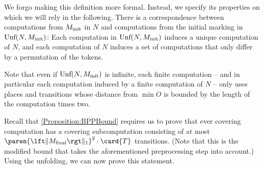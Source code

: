 \documentclass[../../diss.tex]{subfiles}
\begin{document}
We forgo making this definition more formal.
Instead, we specify its properties on which we will rely in the following.
There is a correspondence between computations from $M_{\text{init}}$ in $N$ and computations from the initial marking in $\text{Unf}(N, M_{\text{init}})$:
Each computation in $\text{Unf}(N, M_{\text{init}})$ induces a unique computation of $N$, and each computation of $N$ induces a set of computations that only differ by a permutation of the tokens.

Note that even if $\text{Unf}(N, M_{\text{init}})$ is infinite, each finite computation -- and in particular each computation induced by a finite computation of $N$ -- only uses places and transitions whose distance from $\min O$ is bounded by the length of the computation times two.

Recall that \cref{Proposition:BPPBound} requires us to prove that ever covering computation has a covering subcomputation consisting of at most $\paren{\normone{\Mfinal}}^2 \cdot \card{T}$ transitions.
(Note that this is the modified bound that takes the aforementioned preprocessing step into account.)
Using the unfolding, we can now prove this statement.
\end{document}
